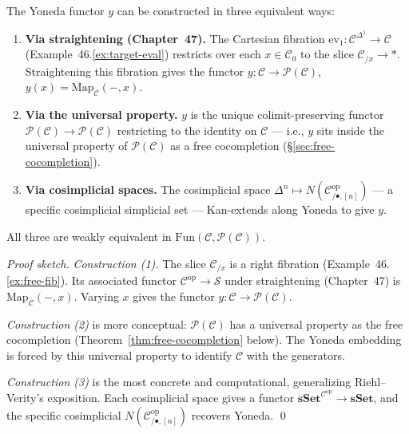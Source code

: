 \begin{theorem}
\label{thm:three-yoneda}
The Yoneda functor $y$ can be constructed in three equivalent ways:
\begin{enumerate}
  \item \textbf{Via straightening (Chapter~47).} The Cartesian fibration
        $\mathrm{ev}_1 : \mathcal{C}^{\Delta^1} \to \mathcal{C}$
        (Example~46.\ref{ex:target-eval}) restricts over each $x \in \mathcal{C}_0$
        to the slice $\mathcal{C}_{/x} \to *$. Straightening this fibration
        gives the functor $y : \mathcal{C} \to \mathcal{P}(\mathcal{C})$,
        $y(x) = \mathrm{Map}_\mathcal{C}(-, x)$.
  \item \textbf{Via the universal property.} $y$ is the unique
        colimit-preserving functor $\mathcal{P}(\mathcal{C}) \to
        \mathcal{P}(\mathcal{C})$ restricting to the identity on $\mathcal{C}$
        — i.e., $y$ sits inside the universal property of $\mathcal{P}(\mathcal{C})$
        as a free cocompletion (\S\ref{sec:free-cocompletion}).
  \item \textbf{Via cosimplicial spaces.} The cosimplicial space
        $\Delta^n \mapsto N(\mathcal{C}^{\mathrm{op}}_{/\bullet, [n]})$ — a
        specific cosimplicial simplicial set — Kan-extends along Yoneda
        to give $y$.
\end{enumerate}
All three are weakly equivalent in $\mathrm{Fun}(\mathcal{C}, \mathcal{P}(\mathcal{C}))$.
\end{theorem}

\begin{proof}[Proof sketch]
\emph{Construction (1).} The slice $\mathcal{C}_{/x}$ is a right fibration
(Example~46.\ref{ex:free-fib}). Its associated functor $\mathcal{C}^{\mathrm{op}}
\to \mathcal{S}$ under straightening (Chapter~47) is $\mathrm{Map}_\mathcal{C}(-, x)$.
Varying $x$ gives the functor $y : \mathcal{C} \to \mathcal{P}(\mathcal{C})$.

\emph{Construction (2)} is more conceptual: $\mathcal{P}(\mathcal{C})$
has a universal property as the free cocompletion (Theorem~\ref{thm:free-cocompletion}
below). The Yoneda embedding is forced by this universal property to
identify $\mathcal{C}$ with the generators.

\emph{Construction (3)} is the most concrete and computational, generalizing
Riehl–Verity's exposition. Each cosimplicial space gives a functor
$\mathbf{sSet}^{\mathcal{C}^{\mathrm{op}}} \to \mathbf{sSet}$, and the
specific cosimplicial $N(\mathcal{C}^{\mathrm{op}}_{/\bullet, [n]})$
recovers Yoneda.
\qed
\end{proof}


